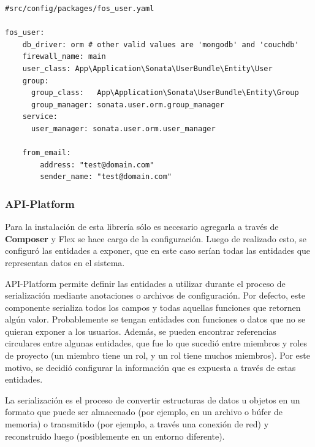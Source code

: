 \begin{lstlisting}[caption=Archivo de configuración de FOSUser.\\Fuente: \sonatainstallation]
#src/config/packages/fos_user.yaml

fos_user:
    db_driver: orm # other valid values are 'mongodb' and 'couchdb'
    firewall_name: main
    user_class: App\Application\Sonata\UserBundle\Entity\User
    group:
      group_class:   App\Application\Sonata\UserBundle\Entity\Group
      group_manager: sonata.user.orm.group_manager
    service:
      user_manager: sonata.user.orm.user_manager

    from_email:
        address: "test@domain.com"
        sender_name: "test@domain.com"

\end{lstlisting}

\newpage
\subsubsection{API-Platform}%
\label{ssub:api_platform}

Para la instalación de esta librería sólo es necesario agregarla a través de \textbf{Composer} y Flex se hace cargo de la configuración\@. Luego de realizado
esto, se configuró las entidades a exponer, que en este caso serían todas las entidades que representan datos en el sistema.


API-Platform permite definir las entidades a utilizar durante el proceso de serialización mediante anotaciones o archivos de configuración. Por defecto,
este componente serializa todos los campos y todas aquellas funciones que retornen algún valor\@. Probablemente se tengan entidades con funciones o datos
que no se quieran exponer a los usuarios. Además, se pueden encontrar referencias circulares entre algunas entidades, que fue lo que sucedió entre miembros
y roles de proyecto (un miembro tiene un rol, y un rol tiene muchos miembros)\@.  Por este motivo, se decidió configurar la información que es expuesta a
través de estas entidades.

\newpage
{}


La serialización es el proceso de convertir estructuras de datos u objetos en un formato que puede ser almacenado (por ejemplo, en un archivo o búfer de memoria)
o transmitido (por ejemplo, a través una conexión de red) y reconstruido luego (posiblemente en un entorno diferente).~\parencite{serialization}

